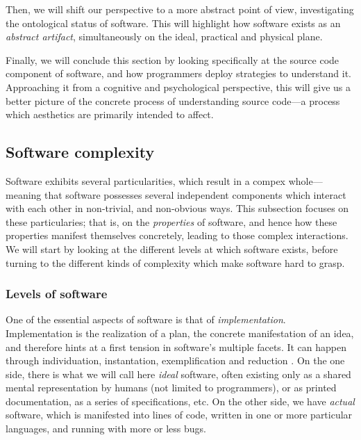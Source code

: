 Then, we will shift our perspective to a more abstract point of view, investigating the ontological status of software. This will highlight how software exists as an \emph{abstract artifact}, simultaneously on the ideal, practical and physical plane.

Finally, we will conclude this section by looking specifically at the source code component of software, and how programmers deploy strategies to understand it. Approaching it from a cognitive and psychological perspective, this will give us a better picture of the concrete process of understanding source code—a process which aesthetics are primarily intended to affect.

\subsection{Software complexity} %

Software exhibits several particularities, which result in a compex whole—meaning that software possesses several independent components which interact with each other in non-trivial, and non-obvious ways. This subsection focuses on these particularies; that is, on the \emph{properties} of software, and hence how these properties manifest themselves concretely, leading to those complex interactions. We will start by looking at the different levels at which software exists, before turning to the different kinds of complexity which make software hard to grasp.

\subsubsection{Levels of software} %

One of the essential aspects of software is that of \emph{implementation}. Implementation is the realization of a plan, the concrete manifestation of an idea, and therefore hints at a first tension in software's multiple facets. It can happen through individuation, instantation, exemplification and reduction \citep{rapaport_philosophy_2005}. On the one side, there is what we will call here \emph{ideal} software, often existing only as a shared mental representation by humans (not limited to programmers), or as printed documentation, as a series of specifications, etc. On the other side, we have \emph{actual} software, which is manifested into lines of code, written in one or more particular languages, and running with more or less bugs.

